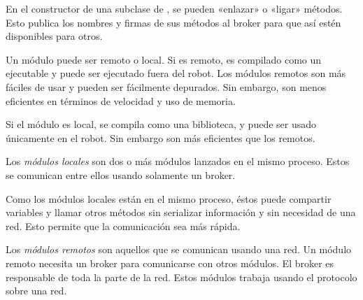 En el constructor de una subclase de , se pueden «enlazar» o
«ligar» 
métodos. Esto publica los nombres y firmas de sus métodos al broker para que así
estén disponibles para otros.

Un módulo puede ser remoto o local. Si es remoto, es compilado como un ejecutable y puede ser ejecutado fuera del robot.
Los módulos remotos son más fáciles de usar y pueden ser fácilmente depurados. Sin
embargo, son menos eficientes en términos de velocidad y uso de memoria.

Si el módulo es local, se compila como una biblioteca, y puede ser usado
únicamente en el robot. Sin embargo son más eficientes que los remotos.



Los \textit{módulos locales} son dos o más módulos lanzados en el mismo proceso. Estos
se comunican entre ellos usando solamente un broker.

Como los módulos locales están en el mismo proceso, éstos puede compartir
variables y llamar otros métodos sin serializar información y sin necesidad de
una red. Esto permite que la comunicación sea más rápida.


Los \textit{módulos remotos} son aquellos que se comunican usando una red. Un módulo
remoto necesita un broker para comunicarse con otros módulos. El broker es
responsable de toda la parte de la red. Estos módulos trabaja usando el
protocolo  sobre una red.


